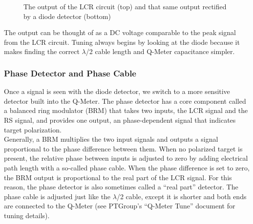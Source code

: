 \begin{figure}
  \vspace{6mm}
  \caption{The output of the LCR circuit (top) and that same output rectified by a diode detector (bottom)}
  \label{diode}
\end{figure}

The output can be thought of as a DC voltage comparable to the peak signal from the LCR circuit. Tuning always begins by looking at the diode because it makes finding the correct $\lambda$/2 cable length and Q-Meter capacitance simpler.

\subsubsection{Phase Detector and Phase Cable}
Once a signal is seen with the diode detector, we switch to a more sensitive detector built into the Q-Meter. The phase detector has a core component called a balanced ring modulator (BRM) that takes two inputs, the LCR signal and the RS signal, and provides one output, an phase-dependent signal that indicates target polarization.\\

Generally, a BRM multiplies the two input signals and outputs a signal proportional to the phase difference between them.  When no polarized target is present, the relative phase between inputs is adjusted to zero by adding electrical path length with a so-called phase cable.  When the phase difference is set to zero, the BRM output is proportional to the real part of the LCR signal. For this reason, the phase detector is also sometimes called a ``real part'' detector. The phase cable is adjusted just like the $\lambda$/2 cable, except it is shorter and both ends are connected to the Q-Meter (see PTGroup's “Q-Meter Tune'' document for tuning details).\\

